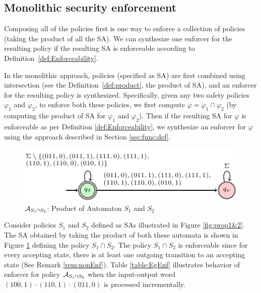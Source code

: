 \subsection{Monolithic security enforcement}
Composing all of the policies first is one way to enforce a collection of policies (taking the product of all the SA).
We can synthesize one enforcer for the resulting policy if the resulting SA is enforceable according to Definition~\ref{def:Enforceability}.


In the monolithic approach, policies (specified as SA) are first combined using intersection (see the Definition~\ref{def:product}, the product of SA), and an enforcer for the resulting policy is synthesized. Specifically, given any two
safety policies $\varphi_1$ and $\varphi_2$, to enforce both these policies, we first compute $\varphi =
\varphi_1 \cap \varphi_2$ (by computing the product of SA for $\varphi_1$ and $\varphi_2$). Then if the resulting SA for $\varphi$ is enforceable as per Definition \ref{def:Enforceability}, we synthesize
an enforcer for $\varphi$ using the approach described in Section \ref{sec:func:def}. 

\begin{figure}[htb]
	\centering
	\includegraphics[scale=1]{fig/sa1sa2-crop2.pdf}
	\caption{${\cal A}_{S_1\cap S_2}$: Product of Automaton $S_1$ and $S_2$}
	\label{fig:prod}
\end{figure}

\begin{example}
	Consider policies $S_1$ and $S_2$ defined as SAs illustrated in Figure \ref{fig:prop1&2}.
	The SA obtained by taking the product of both these automata is shown in Figure \ref{fig:prod} defining the policy $S_1 \cap S_2$.
	The policy $S_1 \cap S_2$ is enforceable since for every accepting state, there is at least one outgoing transition to an accepting state (See Remark \ref{rem:nonEnf}). Table \ref{table:EgEnf} illustrates behavior of enforcer for policy ${\cal A}_{S_1 \cap S_2}$ when the input-output word $(100,1)\cdot(110,1)\cdot(011,0)$ is processed incrementally.
\end{example}	

